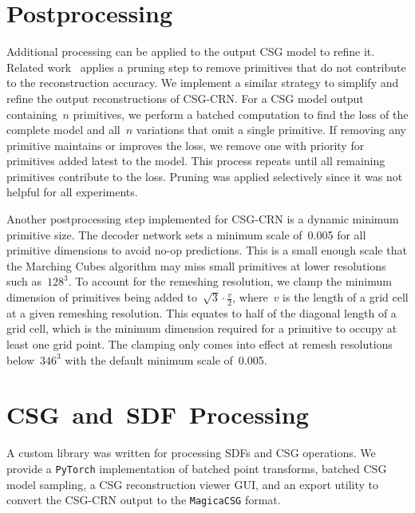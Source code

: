 \section{Postprocessing}
\label{sec:postprocessing}

Additional processing can be applied to the output CSG model to refine it. Related work~\cite{Yu2022, Yu2023} applies a pruning step to remove primitives that do not contribute to the reconstruction accuracy. We implement a similar strategy to simplify and refine the output reconstructions of CSG-CRN. For a CSG model output containing~$n$ primitives, we perform a batched computation to find the loss of the complete model and all~$n$ variations that omit a single primitive. If removing any primitive maintains or improves the loss, we remove one with priority for primitives added latest to the model. This process repeats until all remaining primitives contribute to the loss. Pruning was applied selectively since it was not helpful for all experiments.

Another postprocessing step implemented for CSG-CRN is a dynamic minimum primitive size. The decoder network sets a minimum scale of~0.005 for all primitive dimensions to avoid no-op predictions. This is a small enough scale that the Marching Cubes algorithm may miss small primitives at lower resolutions such as~$128^3$. To account for the remeshing resolution, we clamp the minimum dimension of primitives being added to~$\sqrt{3} \cdot \frac{v}{2}$, where~$v$ is the length of a grid cell at a given remeshing resolution. This equates to half of the diagonal length of a grid cell, which is the minimum dimension required for a primitive to occupy at least one grid point. The clamping only comes into effect at remesh resolutions below~$346^3$ with the default minimum scale of~0.005.


\section{CSG~and~SDF~Processing}
\label{sec:csg_and_sdf_processing}

A custom library was written for processing SDFs and CSG operations. We provide a \texttt{PyTorch} implementation of batched point transforms, batched CSG model sampling, a CSG reconstruction viewer GUI, and an export utility to convert the CSG-CRN output to the \texttt{MagicaCSG} format.
